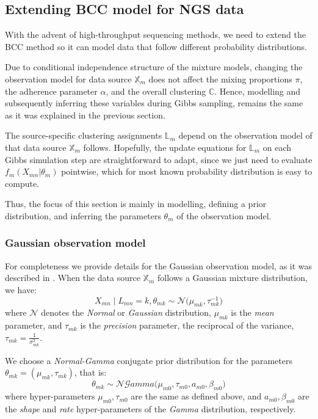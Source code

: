 \subsection{Extending BCC model for NGS data}\label{integr-extension-subsect}
With the advent of high-throughput sequencing methods, we need to extend the BCC method so it can model data that follow different probability distributions.

Due to conditional independence structure of the mixture models, changing the observation model for data source $\mathbb{X}_{m}$ does not affect the mixing proportions $\pi$, the adherence parameter $\alpha$, and the overall clustering $\mathbb{C}$. Hence, modelling and subsequently inferring these variables during Gibbs sampling, remains the same as it was explained in the previous section.

The source-specific clustering assignments $\mathbb{L}_{m}$ depend on the observation model of that data source $\mathbb{X}_{m}$ follows. Hopefully, the update equations for $\mathbb{L}_{m}$ on each Gibbs simulation step are straightforward to adapt, since we just need to evaluate $f_{m}(X_{mn}|\theta_{m})$ pointwise, which for most known probability distribution is easy to compute.

Thus, the focus of this section is mainly in modelling, \ie defining a prior distribution, and inferring the parameters $\theta_{m}$ of the observation model. 

\subsubsection*{Gaussian observation model}
For completeness we provide details for the Gaussian observation model, as it was described in \citet{Lock2013}. When the data source $\mathbb{X}_{m}$ follows a Gaussian mixture distribution, we have:
\begin{equation}
	X_{mn} \mid L_{mn} = k, \theta_{mk} \sim \mathcal{N}\big(\mu_{mk}, \tau_{mk}^{-1}\big)
\end{equation}
where $\mathcal{N}$ denotes the \emph{Normal} or \emph{Gaussian} distribution, $\mu_{mk}$ is the \emph{mean} parameter, and $\tau_{mk}$ is the \emph{precision} parameter, \ie the reciprocal of the variance, $\tau_{mk} = \frac{1}{\sigma_{mk}^{2}}$.

We choose a \emph{Normal-Gamma} conjugate prior distribution for the parameters $\theta_{mk} = (\mu_{mk}, \tau_{mk})$, that is:
\begin{equation}
	\theta_{mk} \sim \mathcal{NG}amma\big(\mu_{m0}, \tau_{m0}, \mathit{a}_{m0}, \beta_{m0}\big)
\end{equation}
where hyper-parameters $\mu_{m0}, \tau_{m0}$ are the same as defined above, and $\mathit{a}_{m0}, \beta_{m0}$ are the \emph{shape} and \emph{rate} hyper-parameters of the \emph{Gamma} distribution, respectively.

